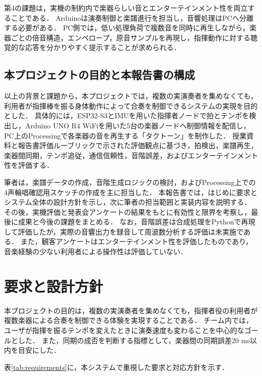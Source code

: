 \documentclass[uplatex,dvipdfmx]{jlreq}
\begin{document}
第4の課題は，実機の制約内で楽器らしい音とエンターテインメント性を両立することである．
Arduinoは演奏制御と楽譜進行を担当し，音響処理はPCへ分離する必要がある．
PC側では，低い処理負荷で複数音を同時に再生しながら，楽器ごとの倍音構造，エンベロープ，原音サンプルを再現し，指揮動作に対する聴覚的な応答を分かりやすく提示することが求められる．

\subsection{本プロジェクトの目的と本報告書の構成}
以上の背景と課題から，本プロジェクトでは，複数の実演奏者を集めなくても，利用者が指揮棒を振る身体動作によって合奏を制御できるシステムの実現を目的とした．
具体的には，ESP32-S3とIMUを用いた指揮者ノードで拍とテンポを検出し，Arduino UNO R4 WiFiを用いた5台の楽器ノードへ制御情報を配信し，PC上のProcessingで各楽器の音を再生する「タクトーン」を制作した．
授業資料と報告書評価ルーブリックで示された評価観点\cite{course,rubric}に基づき，拍検出，楽譜再生，楽器間同期，テンポ追従，通信信頼性，音階誤差，およびエンターテインメント性を評価する．

筆者は，楽譜データの作成，音階生成ロジックの検討，およびProcessing上での4声輪唱確認用スケッチの作成を主に担当した．
本報告書では，はじめに要求とシステム全体の設計方針を示し，次に筆者の担当範囲と実装内容を説明する．
その後，実機評価と発表会アンケートの結果をもとに有効性と限界を考察し，最後に成果と今後の課題をまとめる．
なお，音階誤差は合成処理をPythonで再現して評価したが，実際の音響出力を録音して周波数分析する評価は未実施である．
また，観客アンケートはエンターテインメント性を評価したものであり，音楽経験の少ない利用者による操作性は評価していない．

\section{要求と設計方針}
本プロジェクトの目的は，複数の実演奏者を集めなくても，指揮者役の利用者が複数楽器による合奏を制御できる体験を実現することである．
チーム内では，ユーザが指揮を振るテンポを変えたときに演奏速度も変わることを中心的なゴールとした．
また，同期の成否を判断する指標として，楽器間の同期誤差20 ms以内を目安にした．

表\ref{tab:requirements}に，本システムで重視した要求と対応方針を示す．
\end{document}
